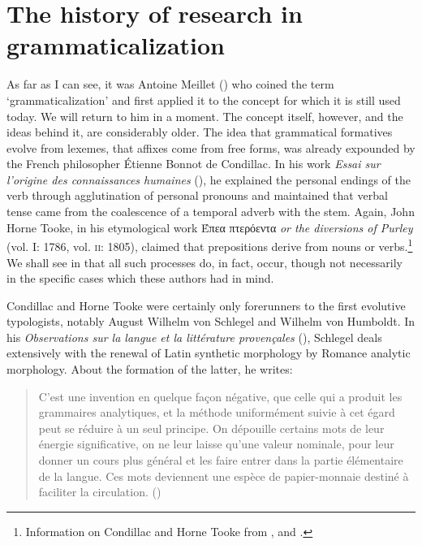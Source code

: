 \chapter{The history of research in grammaticalization} \label{chap:1}

As far as I can see, it was Antoine Meillet (\citeyear{Meillet1912}) who coined the term ‘grammaticalization’ and first applied it to the concept for which it is still used today. We will return to him in a moment. The concept itself, however, and the ideas behind it, are considerably older. The idea that grammatical formatives evolve from lexemes, that affixes come from free forms, was already expounded by the French philosopher Étienne Bonnot de Condillac. In his work \textit{Essai sur l'origine des connaissances humaines} (\citeyear{Condillac1746}), he explained the personal endings of the verb through agglutination of personal pronouns and maintained that verbal tense came from the coalescence of a temporal adverb with the stem. Again, John Horne Tooke, in his etymological work Έπεα πτερόεντα \textit{or the diversions of Purley} (vol. I: 1786, vol. \textsc{ii}: 1805), claimed that prepositions derive from nouns or verbs.\footnote{Information on Condillac and Horne Tooke from \citet[109f, 132--134]{Arens1969}, and \citet[119, 452f]{Stammerjohann1975}.} We shall see in  that all such processes do, in fact, occur, though not necessarily in the specific cases which these authors had in mind.

Condillac and Horne Tooke were certainly only forerunners to the first evolutive typologists, notably August Wilhelm von Schlegel and Wilhelm von Humboldt. In his \textit{Observations sur la langue et la littérature provençales} (\citeyear{Schlegel1818}), Schlegel deals extensively with the renewal of Latin synthetic morphology by Romance analytic morphology. About the formation of the latter, he writes:

\begin{quote}
C'est une invention en quelque façon négative, que celle qui a produit les grammaires analytiques, et la méthode uniformément suivie à cet égard peut se réduire à un seul principe. On dépouille certains mots de leur énergie significative, on ne leur laisse qu'une valeur nominale, pour leur donner un cours plus général et les faire entrer dans la partie élémentaire de la langue. Ces mots deviennent une espèce de papier-monnaie destiné à faciliter la circulation. (\citeyear[28]{Schlegel1818})
\end{quote}

